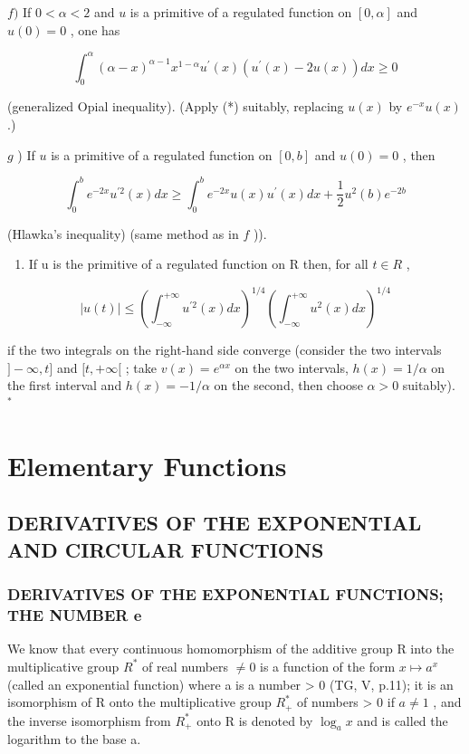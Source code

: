 \(f)\) If \(0 < \alpha < 2\) and \(u\) is a primitive of a regulated function on \([0, \alpha]\) and \(u(0) = 0\) , one has

\[
\int_ {0} ^ {\alpha} (\alpha - x) ^ {\alpha - 1} x ^ {1 - \alpha} u ^ {\prime} (x) \left(u ^ {\prime} (x) - 2 u (x)\right) d x \geqslant 0
\]

(generalized Opial inequality). (Apply (*) suitably, replacing \(u(x)\) by \(e^{-x}u(x)\) .)

\(g\) ) If \(u\) is a primitive of a regulated function on \([0,b]\) and \(u(0) = 0\) , then

\[
\int_ {0} ^ {b} e ^ {- 2 x} u ^ {\prime 2} (x) d x \geqslant \int_ {0} ^ {b} e ^ {- 2 x} u (x) u ^ {\prime} (x) d x + \frac {1}{2} u ^ {2} (b) e ^ {- 2 b}
\]

(Hlawka's inequality) (same method as in \(f\) )).

\begin{enumerate}
\def\labelenumi{\alph{enumi})}
\setcounter{enumi}{7}
\tightlist
\item
  If u is the primitive of a regulated function on R then, for all \(t \in R\) ,
\end{enumerate}

\[
| u (t) | \leqslant \left(\int_ {- \infty} ^ {+ \infty} u ^ {\prime 2} (x) d x\right) ^ {1 / 4} \left(\int_ {- \infty} ^ {+ \infty} u ^ {2} (x) d x\right) ^ {1 / 4}
\]

if the two integrals on the right-hand side converge (consider the two intervals \(]-\infty,t]\) and \([t,+\infty[\) ; take \(v(x)=e^{\alpha x}\) on the two intervals, \(h(x)=1/\alpha\) on the first interval and \(h(x)=-1/\alpha\) on the second, then choose \(\alpha>0\) suitably). \(^{*}\)

\chapter{Elementary Functions}

\section{DERIVATIVES OF THE EXPONENTIAL AND CIRCULAR FUNCTIONS}

\subsection{DERIVATIVES OF THE EXPONENTIAL FUNCTIONS; THE NUMBER e}

We know that every continuous homomorphism of the additive group R into the multiplicative group \(R^{*}\) of real numbers \(\neq 0\) is a function of the form \(x \mapsto a^{x}\) (called an exponential function) where a is a number \textgreater{} 0 (TG, V, p.11); it is an isomorphism of R onto the multiplicative group \(R_{+}^{*}\) of numbers \textgreater{} 0 if \(a \neq 1\) , and the inverse isomorphism from \(R_{+}^{*}\) onto R is denoted by \(\log_{a} x\) and is called the logarithm to the base a.

